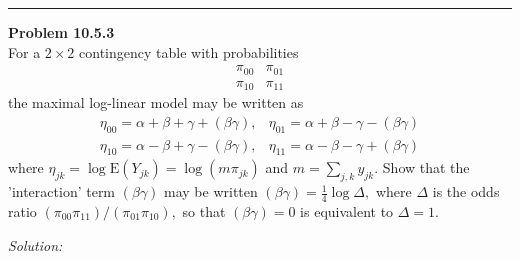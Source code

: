 \documentclass[a4paper, 11pt]{article}
\newenvironment{problem}[2][Problem]
    { \begin{mdframed}[backgroundcolor=gray!20] \textbf{#1 #2} \\}
    {  \end{mdframed}}
\newenvironment{solution}
    {\textit{Solution:}}
    {}
\begin{document}
\noindent\rule{7in}{2.8pt}
\begin{problem}{10.5.3}
  For a $2 \times 2$ contingency table with probabilities
  $$
  \begin{array}{ll}
  \pi_{00} & \pi_{01} \\
  \pi_{10} & \pi_{11}
  \end{array}
  $$
  the maximal log-linear model may be written as
  $$
  \begin{array}{ll}
  \eta_{00}=\alpha+\beta+\gamma+(\beta \gamma), & \eta_{01}=\alpha+\beta-\gamma-(\beta \gamma) \\
  \eta_{10}=\alpha-\beta+\gamma-(\beta \gamma), & \eta_{11}=\alpha-\beta-\gamma+(\beta \gamma)
  \end{array}
  $$
  where $\eta_{j k}=\log \mathrm{E}\left(Y_{j k}\right)=\log \left(m \pi_{j k}\right)$ and $m=\sum_{j, k} y_{j k} .$ Show that the 'interaction' term
  $(\beta \gamma)$ may be written $(\beta \gamma)=\frac{1}{4} \log \Delta,$ where $\Delta$ is the odds ratio $\left(\pi_{00} \pi_{11}\right) /\left(\pi_{01} \pi_{10}\right),$ so that
  $(\beta \gamma)=0$ is equivalent to $\Delta=1$.

\end{problem}
\begin{solution}

\end{solution}
\end{document}
